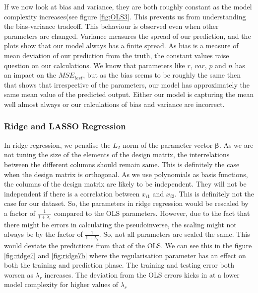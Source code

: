 If we now look at bias and variance, they are both roughly constant as the model complexity increases(see figure \ref{fig:OLS3}. This prevents us from understanding the bias-variance tradeoff. This behaviour is observed even when other parameters are changed. Variance measures the spread of our prediction, and the plots show that our model always has a finite spread. As bias is a measure of mean deviation of our prediction from the truth, the constant values raise question on our calculations. We know that parameters like $r$, $var$, $p$ and $n$ has an impact on the $MSE_{test}$, but as the bias seems to be roughly the same then that shows that irrespective of the parameters, our model has approximately the same mean value of the predicted output. Either our model is capturing the mean well almost always or our calculations of bias and variance are incorrect.

\subsubsection{Ridge and LASSO Regression}
In ridge regression, we penalise the $L_2$ norm of the parameter vector $\boldsymbol \beta$. As we are not tuning the size of the elements of the design matrix, the interrelations between the different columns should remain same. This is definitely the case when the design matrix is orthogonal. As we use polynomials as basis functions, the columns of the design matrix are likely to be independent. They will not be independent if there is a correlation between $x_{i1}$ and $x_{i2}$. This is definitely not the case for our dataset. So, the parameters in ridge regression would be rescaled by a factor of $\frac{1}{1+\lambda_r}$ compared to the OLS parameters\cite{mehta_high-bias_2019}. However, due to the fact that there might be errors in calculating the pseudoinverse, the scaling might not always be by the factor of $\frac{1}{1+\lambda_r}$. So, not all parameters are scaled the same. This would deviate the predictions from that of the OLS. We can see this in the figure \ref{fig:ridge7} and \ref{fig:ridge7b} where the regularisation parameter has an effect on both the training and prediction phase. The training and testing error both worsen as $\lambda_r$ increases. The deviation from the OLS errors kicks in at a lower model complexity for higher values of  $\lambda_r$



